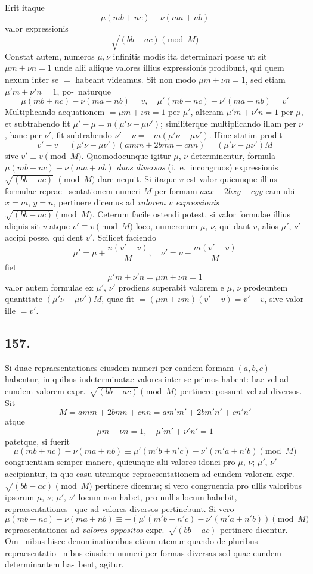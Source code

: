 \documentclass[12pt,a4paper]{article}
\theoremstyle{plain}
\theoremstyle{definition}
\theoremstyle{remark}
\begin{document}
Erit itaque
\[
\mu(mb+nc) - \nu(ma+nb)
\]
valor expressionis
\[
\sqrt{(bb-ac)} \pmod{M}
\]
Constat autem, numeros $\mu, \nu$ infinitis modis ita determinari posse ut sit $\mu m + \nu n = 1$
unde alii aliique valores illius expressionis prodibunt, qui quem nexum inter se
$=$ habeant videamus. Sit non modo $\mu m + \nu n = 1$, sed etiam $\mu' m + \nu' n = 1$, po-\ naturque
\[
\mu(mb+nc) - \nu(ma+nb) = v, \quad \mu'(mb+nc) - \nu'(ma+nb) = v'
\]
Multiplicando aequationem $= \mu m + \nu n = 1$ per $\mu'$, alteram $\mu' m + \nu' n = 1$ per $\mu$,
et subtrahendo fit $\mu' - \mu = n(\mu'\nu - \mu\nu')$; similiterque multiplicando illam per $\nu$,
hanc per $\nu'$, fit subtrahendo $\nu' - \nu = -m(\mu'\nu - \mu\nu')$. Hinc statim prodit
\[
v' - v = (\mu'\nu - \mu\nu')(amm + 2bmn + cnn) = (\mu'\nu - \mu\nu')M
\]
sive $v' \equiv v \pmod{M}$. Quomodocunque igitur $\mu$, $\nu$ determinentur, formula
$\mu(mb+nc) - \nu(ma+nb)$ \emph{duos diversos} (i.~e.\ incongruos) expressionis $\sqrt{(bb-ac)}$
$\pmod{M}$ dare nequit. Si itaque $v$ est valor quicunque illius formulae reprae-\ sentationem numeri $M$ per formam $axx + 2bxy + cyy$ eam ubi $x = m$, $y = n$,
pertinere dicemus ad \emph{valorem $v$ expressionis} $\sqrt{(bb-ac)} \pmod{M}$. Ceterum facile
ostendi potest, si valor formulae illius aliquis sit $v$ atque $v' \equiv v \pmod{M}$ loco,
numerorum $\mu$, $\nu$, qui dant $v$, alios $\mu'$, $\nu'$ accipi posse, qui dent $v'$. Scilicet
faciendo
\[
\mu' = \mu + \frac{n(v'-v)}{M}, \quad \nu' = \nu - \frac{m(v'-v)}{M}
\]
fiet
\[
\mu' m + \nu' n = \mu m + \nu n = 1
\]
valor autem formulae ex $\mu'$, $\nu'$ prodiens superabit valorem e $\mu$, $\nu$ prodeuntem
quantitate $(\mu'\nu - \mu\nu')M$, quae fit $= (\mu m + \nu m)(v'-v) = v'-v$, sive valor ille
$= v'$.

\subsection*{157.}

Si duae repraesentationes eiusdem numeri per eandem formam $(a, b, c)$
habentur, in quibus indeterminatae valores inter se primos habent: hae vel ad
eundem valorem expr.\ $\sqrt{(bb-ac)} \pmod{M}$ pertinere possunt vel ad diversos. Sit
\[
M = amm + 2bmn + cnn = am'm' + 2bm'n' + cn'n'
\]
atque
\[
\mu m + \nu n = 1, \quad \mu' m' + \nu' n' = 1
\]
patetque, si fuerit
\[
\mu(mb+nc) - \nu(ma+nb) \equiv \mu'(m'b+n'c) - \nu'(m'a+n'b) \pmod{M}
\]
congruentiam semper manere, quicunque alii valores idonei pro $\mu$, $\nu$; $\mu'$, $\nu'$
accipiantur, in quo casu utramque repraesentationem ad eundem valorem expr.\ $\sqrt{(bb-ac)} \pmod{M}$ pertinere dicemus; si vero congruentia pro ullis valoribus
ipsorum $\mu$, $\nu$; $\mu'$, $\nu'$ locum non habet, pro nullis locum habebit, repraesentationes-\ que ad valores diversos pertinebunt. Si vero
\[
\mu(mb+nc) - \nu(ma+nb) \equiv -(\mu'(m'b+n'c) - \nu'(m'a+n'b)) \pmod{M}
\]
repraesentationes ad \emph{valores oppositos} expr.\ $\sqrt{(bb-ac)}$ pertinere dicentur. Om-\ nibus hisce denominationibus etiam utemur quando de pluribus repraesentatio-\ nibus eiusdem numeri per formas diversas sed quae eundem determinantem ha-\ bent, agitur.
\end{document}

